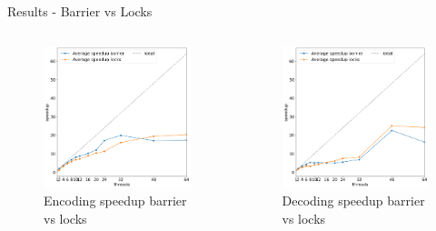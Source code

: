 \begin{frame}{Results - Barrier vs Locks}
    \begin{columns}
            \begin{figure}
                \centering
                \includegraphics[width=\textwidth]{imgs/encode average speedup barrier vs locks.png}
                \caption{Encoding speedup barrier vs locks}
                \label{fig:encoding-speedup}
            \end{figure}
            \begin{figure}
                \centering
                \includegraphics[width=\textwidth]{imgs/decode average speedup barrier vs locks}
                \caption{Decoding speedup barrier vs locks}
                \label{fig:encoding-efficiency}
            \end{figure}
    \end{columns}
\end{frame}
